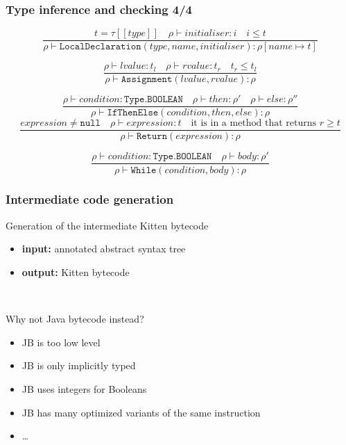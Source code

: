 \documentclass[11pt]{beamer}  %
\begin{document}
\begin{frame}[fragile]\frametitle{Type inference and checking 4/4}

  \[
    \frac{t=\tau[\![\mathit{type}]\!]\quad\rho\vdash\mathit{initialiser}:i\quad 
          i\le t}
         {\rho\vdash\mathtt{LocalDeclaration(\mathit{type},\mathit{name},
          \mathit{initialiser})}:\rho[\mathit{name}\mapsto t]}
  \]

\[
    \frac{\rho\vdash\mathit{lvalue}:t_l\quad\rho\vdash\mathit{rvalue}:t_r
          \quad t_r\le t_l}
         {\rho\vdash\mathtt{Assignment(\mathit{lvalue},\mathit{rvalue})}:\rho}
  \]

 \[
    \frac{\rho\vdash\mathit{condition}:\mathtt{Type.BOOLEAN}\quad
          \rho\vdash\mathit{then}:\rho'\quad
          \rho\vdash\mathit{else}:\rho''}
         {\rho\vdash\mathtt{IfThenElse(\mathit{condition},\mathit{then},
          \mathit{else}):\rho}}
  \]
  \[
    \frac{\mathit{expression}\not=\mathtt{null}\quad
          \rho\vdash\mathit{expression}:t\quad
          \text{it is in a method that returns $r\ge t$}}
         {\rho\vdash\mathtt{Return(\mathit{expression})}:\rho}
  \]

  \[
    \frac{\rho\vdash\mathit{condition}:\mathtt{Type.BOOLEAN}\quad
          \rho\vdash\mathit{body}:\rho'}
         {\rho\vdash\mathtt{While(\mathit{condition},\mathit{body})}:\rho}
  \]

\end{frame}

\begin{frame}
\frametitle{Intermediate code generation}

\begin{center}
\begin{redbox}{Generation of the intermediate Kitten bytecode}
\begin{itemize}
\item \textbf{input:} annotated abstract syntax tree
\item \textbf{output:} Kitten bytecode
\end{itemize}
\end{redbox}
\end{center}

\mbox{}\\

\begin{pinkbox}{Why not Java bytecode instead?}
\begin{itemize}
\item JB is too low level
\item JB is only implicitly typed
\item JB uses integers for Booleans
\item JB has many optimized variants of the same instruction
\item \ldots
\end{itemize}
\end{pinkbox}

\end{frame}
\end{document}
